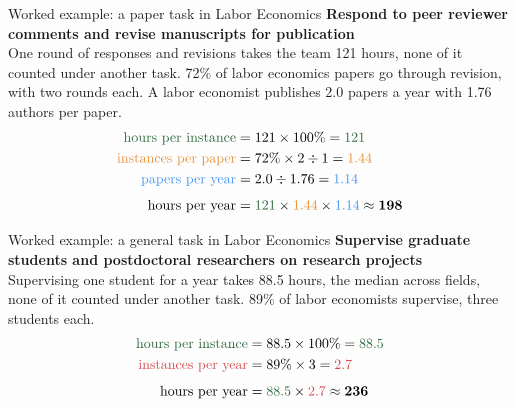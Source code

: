\documentclass[aspectratio=169,11pt]{beamer}
\newcommand{\HI}[1]{{\color{lagreen}#1}}        %
\newcommand{\IN}[1]{{\color{laorange}#1}}       %
\newcommand{\PY}[1]{{\color{lalightblue}#1}}    %
\newcommand{\IY}[1]{{\color{lared}#1}}          %
\newcommand{\tx}[1]{\text{#1}}
\begin{document}
\begin{frame}{Worked example: a paper task in Labor Economics}
\textbf{Respond to peer reviewer comments and revise manuscripts for publication}\\[0.6em]
\small
One round of responses and revisions takes the team 121 hours, none of it counted under another task. 72\% of labor
economics papers go through revision, with two rounds each. A labor economist publishes 2.0 papers a year with 1.76
authors per paper.
\begin{align*}
\HI{\tx{hours per instance}} &= 121 \times 100\% = \HI{121}\\
\IN{\tx{instances per paper}} &= 72\% \times 2 \div 1 = \IN{1.44}\\
\PY{\tx{papers per year}} &= 2.0 \div 1.76 = \PY{1.14}\\[0.4em]
\tx{hours per year} &= \HI{121} \times \IN{1.44} \times \PY{1.14} \approx \textbf{198}
\end{align*}
\end{frame}

\begin{frame}{Worked example: a general task in Labor Economics}
\textbf{Supervise graduate students and postdoctoral researchers on research projects}\\[0.6em]
\small
Supervising one student for a year takes 88.5 hours, the median across fields, none of it counted under another task. 89\% of labor economists
supervise, three students each.
\begin{align*}
\HI{\tx{hours per instance}} &= 88.5 \times 100\% = \HI{88.5}\\
\IY{\tx{instances per year}} &= 89\% \times 3 = \IY{2.7}\\[0.4em]
\tx{hours per year} &= \HI{88.5} \times \IY{2.7} \approx \textbf{236}
\end{align*}
\end{frame}
\end{document}
